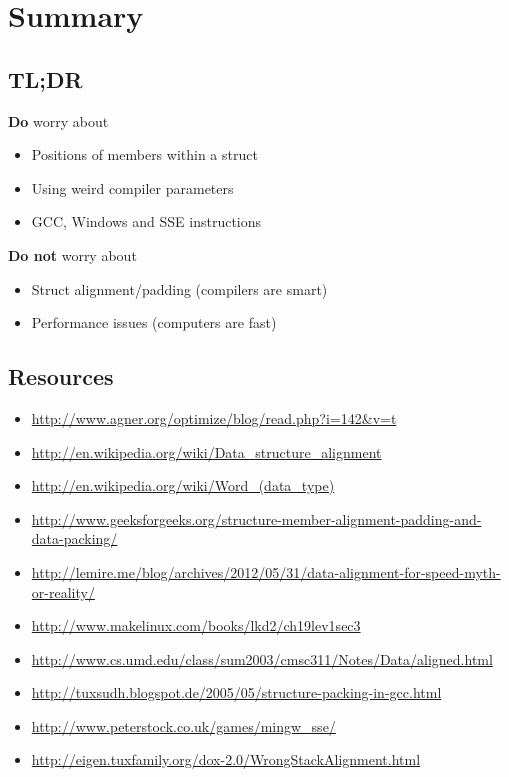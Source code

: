 \documentclass{beamer}
\begin{document}
\section{Summary}
\subsection{TL;DR}
\begin{frame}{\insertsection}{\insertsubsection}
    \begin{block}{\textbf{Do} worry about}
        \begin{itemize}
            \item Positions of members within a struct
            \item Using weird compiler parameters
            \item GCC, Windows and SSE instructions
        \end{itemize}
    \end{block}
    \pause
    \begin{block}{\textbf{Do not} worry about}
        \begin{itemize}
            \item Struct alignment/padding (compilers are smart)
            \item Performance issues (computers are fast)
        \end{itemize}
    \end{block}
\end{frame}

\subsection{Resources}
\begin{frame}{\insertsection}{\insertsubsection}
	\begin{itemize}
        \tiny
        \item \url{http://www.agner.org/optimize/blog/read.php?i=142&v=t}
        \item \url{http://en.wikipedia.org/wiki/Data_structure_alignment}
        \item \url{http://en.wikipedia.org/wiki/Word_(data_type)}
        \item \url{http://www.geeksforgeeks.org/structure-member-alignment-padding-and-data-packing/}
        \item \url{http://lemire.me/blog/archives/2012/05/31/data-alignment-for-speed-myth-or-reality/}
        \item \url{http://www.makelinux.com/books/lkd2/ch19lev1sec3}
        \item \url{http://www.cs.umd.edu/class/sum2003/cmsc311/Notes/Data/aligned.html}
        \item \url{http://tuxsudh.blogspot.de/2005/05/structure-packing-in-gcc.html}
        \item \url{http://www.peterstock.co.uk/games/mingw_sse/}
        \item \url{http://eigen.tuxfamily.org/dox-2.0/WrongStackAlignment.html}
	\end{itemize}
\end{frame}
\end{document}
